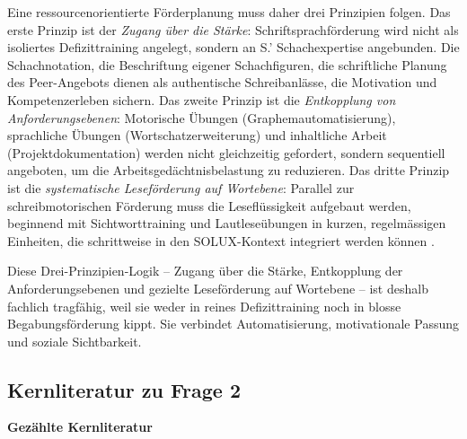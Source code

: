 \documentclass[ngerman, a4paper]{article}
\begin{document}
Eine ressourcenorientierte Förderplanung muss daher drei Prinzipien folgen. Das erste
Prinzip ist der \textit{Zugang über die Stärke}: Schriftsprachförderung wird nicht als
isoliertes Defizittraining angelegt, sondern an S.' Schachexpertise angebunden. Die
Schachnotation, die Beschriftung eigener Schachfiguren, die schriftliche Planung des
Peer-Angebots dienen als authentische Schreibanlässe, die Motivation und Kompetenzerleben
sichern. Das zweite Prinzip ist die \textit{Entkopplung von Anforderungsebenen}: Motorische
Übungen (Graphemautomatisierung), sprachliche Übungen (Wortschatzerweiterung) und
inhaltliche Arbeit (Projektdokumentation) werden nicht gleichzeitig gefordert, sondern
sequentiell angeboten, um die Arbeitsgedächtnisbelastung zu reduzieren. Das dritte
Prinzip ist die \textit{systematische Leseförderung auf Wortebene}: Parallel zur
schreibmotorischen Förderung muss die Leseflüssigkeit aufgebaut werden, beginnend
mit Sichtworttraining und Lautleseübungen in kurzen, regelmässigen Einheiten, die
schrittweise in den SOLUX-Kontext integriert werden können
\parencite[S.\,62,\,70,\,88]{gold2018lesenkannmanlernen}.

Diese Drei-Prinzipien-Logik -- Zugang über die Stärke, Entkopplung der
Anforderungsebenen und gezielte Leseförderung auf Wortebene -- ist deshalb
fachlich tragfähig, weil sie weder in reines Defizittraining noch in blosse
Begabungsförderung kippt. Sie verbindet Automatisierung, motivationale Passung
und soziale Sichtbarkeit.

\subsection{Kernliteratur zu Frage 2}

\textbf{Gezählte Kernliteratur}
\end{document}
